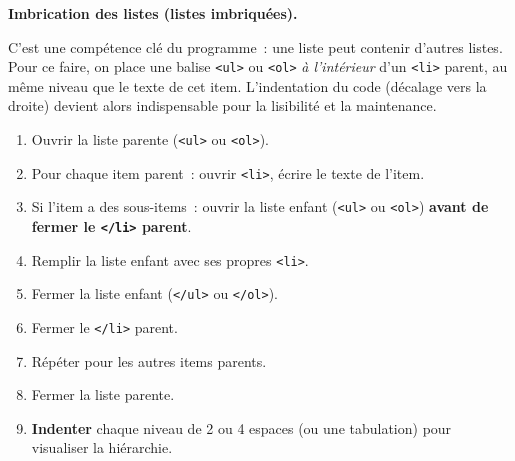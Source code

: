\documentclass[11pt]{article}
\begin{document}
\textbf{Imbrication des listes (listes imbriquées).}\par
C'est une compétence clé du programme~: une liste peut contenir d'autres listes. Pour ce faire, on place une balise \texttt{<ul>} ou \texttt{<ol>} \emph{à l'intérieur} d'un \texttt{<li>} parent, au même niveau que le texte de cet item. L'indentation du code (décalage vers la droite) devient alors indispensable pour la lisibilité et la maintenance.

\begin{methode}
\begin{enumerate}
    \item Ouvrir la liste parente (\texttt{<ul>} ou \texttt{<ol>}).
    \item Pour chaque item parent~: ouvrir \texttt{<li>}, écrire le texte de l'item.
    \item Si l'item a des sous-items~: ouvrir la liste enfant (\texttt{<ul>} ou \texttt{<ol>}) \textbf{avant de fermer le \texttt{</li>} parent}.
    \item Remplir la liste enfant avec ses propres \texttt{<li>}.
    \item Fermer la liste enfant (\texttt{</ul>} ou \texttt{</ol>}).
    \item Fermer le \texttt{</li>} parent.
    \item Répéter pour les autres items parents.
    \item Fermer la liste parente.
    \item \textbf{Indenter} chaque niveau de 2 ou 4 espaces (ou une tabulation) pour visualiser la hiérarchie.
\end{enumerate}
\end{methode}
\end{document}
